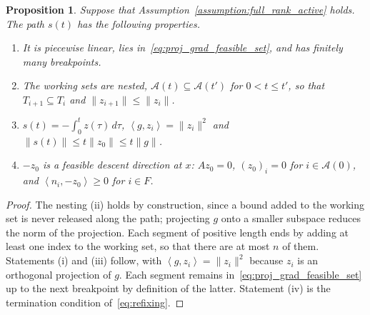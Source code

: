 \documentclass[pdflatex,sn-mathphys-num]{sn-jnl}%
\theoremstyle{thmstyleone}%
\newtheorem{proposition}[theorem]{Proposition}
\newcommand{\calA}{{\mathcal{A}}}
\newcommand{\inner}[2]{\left\langle {#1} , {#2} \right\rangle} %
\begin{document}
\begin{proposition}\label{prop:computed_path}
	Suppose that Assumption~\ref{assumption:full_rank_active} holds. The path $s(t)$ has the following properties.
	\begin{enumerate}[label=(\roman*), leftmargin=*, itemsep=2pt]
		\item It is piecewise linear, lies in~\eqref{eq:proj_grad_feasible_set}, and has finitely many breakpoints.
		\item The working sets are nested, $\calA(t) \subseteq \calA(t')$ for $0 < t \le t'$, so that $T_{i+1} \subseteq T_i$ and $\|z_{i+1}\| \le \|z_i\|$.
		\item $s(t) = -\int_0^t z(\tau)\,d\tau$, $\inner{g}{z_i} = \|z_i\|^2$ and $\|s(t)\| \le t\|z_0\| \le t\|g\|$.
		\item $-z_0$ is a feasible descent direction at $x$: $Az_0 = 0$, $(z_0)_i = 0$ for $i \in \calA(0)$, and $\inner{n_i}{-z_0} \ge 0$ for $i \in F$.
	\end{enumerate}
\end{proposition}
\begin{proof}
	The nesting (ii) holds by construction, since a bound added to the working set is never released along the path; projecting $g$ onto a smaller subspace reduces the norm of the projection. Each segment of positive length ends by adding at least one index to the working set, so that there are at most $n$ of them. Statements (i) and (iii) follow, with $\inner{g}{z_i} = \|z_i\|^2$ because $z_i$ is an orthogonal projection of $g$. Each segment remains in~\eqref{eq:proj_grad_feasible_set} up to the next breakpoint by definition of the latter. Statement (iv) is the termination condition of~\eqref{eq:refixing}.
\end{proof}
\end{document}
